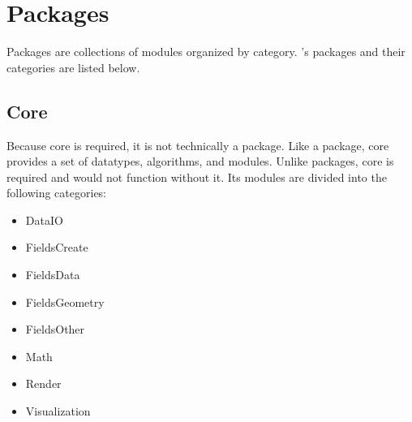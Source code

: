 %
% 
% 
% 
% 
% 
%

%

\chapter{Packages}
\label{ch:packages}

Packages are collections of modules organized by category. \sr{}'s 
packages and their categories are listed below.   

\section{\sr{} Core}
\label{sec:srpackage}

Because \sr{} core is required, it is not technically a package.
Like a package, \sr{} core provides a set of datatypes, algorithms,
and modules.  Unlike packages, \sr{} core is required and \sr{} would
not function without it. Its modules are divided into the
following categories:

\begin{itemize}
  \item DataIO
  \item FieldsCreate
  \item FieldsData
  \item FieldsGeometry
  \item FieldsOther
  \item Math
  \item Render
  \item Visualization
\end{itemize}

